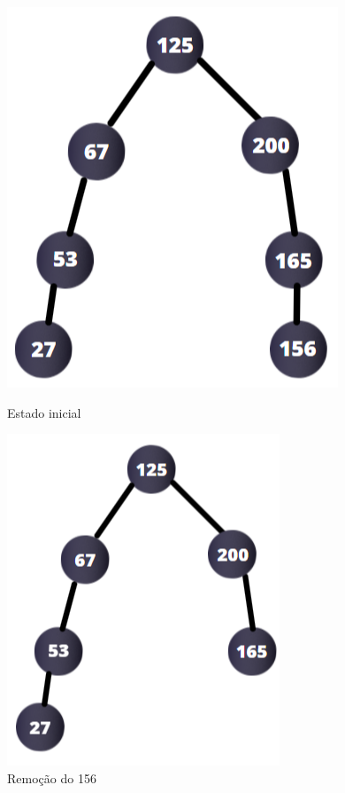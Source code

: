 \documentclass[11pt]{article} %
\begin{document}
\begin{enumerate}[a)]
\begin{figure}
    \centering
    \begin{minipage}{0.45\textwidth}
        \centering
        \includegraphics[scale = 0.6]{codigobin1.png}
        \caption{Estado inicial}
    \end{minipage}\hfill
    \begin{minipage}{0.45\textwidth}
        \centering
        \includegraphics[scale = 0.686]{codigobin2.png}
        \caption{Remoção do 156}
    \end{minipage}
\end{figure}


\end{enumerate}
\end{document}
